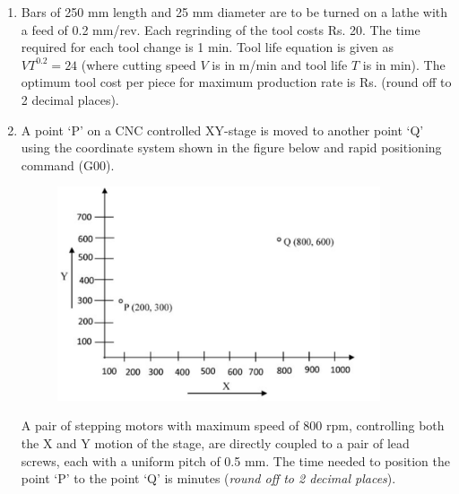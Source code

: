 \documentclass[12pt,onecolumn]{article}
\begin{document}
\begin{enumerate}
    \item Bars of 250 mm length and 25 mm diameter are to be turned on a lathe with a feed of 0.2 mm/rev. Each regrinding of the tool costs Rs. 20. The time required for each tool change is 1 min. Tool life equation is given as $VT^{0.2} = 24$ (where cutting speed $V$ is in m/min and tool life $T$ is in min). The optimum tool cost per piece for maximum production rate is Rs. \underline{\hspace{2cm}} (round off to 2 decimal places).

    \item A point `P' on a CNC controlled XY-stage is moved to another point `Q' using the coordinate system shown in the figure below and rapid positioning command (G00).
          \begin{figure}[H]
              \centering
              \includegraphics[width=0.9\textwidth]{q46s2}
              \label{fig:q46s2}
          \end{figure}
          A pair of stepping motors with maximum speed of 800 rpm, controlling both the X and Y motion of the stage, are directly coupled to a pair of lead screws, each with a uniform pitch of 0.5 mm. The time needed to position the point `P' to the point `Q' is \underline{\hspace{2cm}} minutes (\textit{round off to 2 decimal places}).


\end{enumerate}
\end{document}
